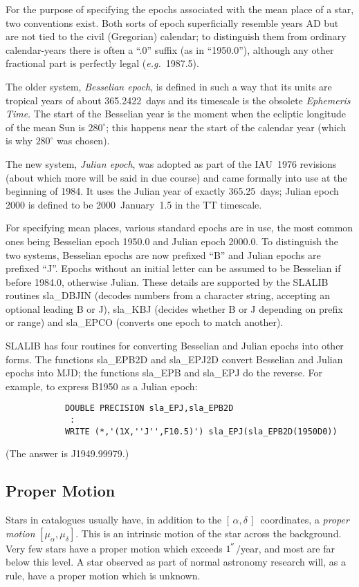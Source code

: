 \documentclass[11pt,twoside]{article}
\newcommand{\radec}     {$[\,\alpha,\delta\,]$}
\newcommand{\arcseci}[1] {$#1\hspace{-0.05em}$\raisebox{-0.5ex}
                         {$^{'\hspace{-0.1em}'}$}}
\renewcommand{\arcseci}[1] {$#1\hspace{-0.05em}^{'\hspace{-0.1em}'}$}
\begin{document}
For the purpose of specifying the epochs associated with the
mean place of a star, two conventions exist.  Both sorts of epoch
superficially resemble years AD but are not tied to the civil
(Gregorian) calendar;  to distinguish them from ordinary calendar-years
there is often
a ``.0'' suffix (as in ``1950.0''), although any other fractional
part is perfectly legal ({\it e.g.}\ 1987.5).

The older system,
{\it Besselian epoch}, is defined in such a way that its units are
tropical years of about 365.2422~days and its timescale is the
obsolete {\it Ephemeris Time}.
The start of the Besselian year is the moment
when the ecliptic longitude of the mean Sun is
$280^{\circ}$;  this happens near the start of the
calendar year (which is why $280^{\circ}$ was chosen).

The new system, {\it Julian epoch}, was adopted as
part of the IAU~1976 revisions (about which more will be said
in due course) and came formally into use at the
beginning of 1984.  It uses the Julian year of exactly
365.25~days; Julian epoch 2000 is defined to be 2000~January~1.5 in the
TT timescale.

For specifying mean places, various standard epochs are in use, the
most common ones being Besselian epoch 1950.0 and Julian epoch 2000.0.
To distinguish the two systems, Besselian epochs
are now prefixed ``B'' and Julian epochs are prefixed ``J''.
Epochs without an initial letter can be assumed to be Besselian
if before 1984.0, otherwise Julian.  These details are supported by
the SLALIB routines
sla\_DBJIN
(decodes numbers from a
character string, accepting an optional leading B or J),
sla\_KBJ
(decides whether B or J depending on prefix or range) and
sla\_EPCO
(converts one epoch to match another).

SLALIB has four routines for converting
Besselian and Julian epochs into other forms.
The functions
sla\_EPB2D
and
sla\_EPJ2D
convert Besselian and Julian epochs into MJD; the functions
sla\_EPB
and
sla\_EPJ
do the reverse.  For example, to express B1950 as a Julian epoch:
\goodbreak
\begin{verbatim}
            DOUBLE PRECISION sla_EPJ,sla_EPB2D
             :
            WRITE (*,'(1X,''J'',F10.5)') sla_EPJ(sla_EPB2D(1950D0))
\end{verbatim}
\goodbreak
(The answer is J1949.99979.)

\subsection{Proper Motion}
Stars in catalogues usually have, in addition to the 
\radec\  coordinates, a {\it proper motion} $[\mu_\alpha,\mu_\delta]$.
This is an intrinsic motion
of the star across the background.  Very few stars have a
proper motion which exceeds \arcseci{1}/year, and most are
far below this level.  A star observed as part of normal
astronomy research will, as a rule, have a proper motion
which is unknown.
\end{document}
